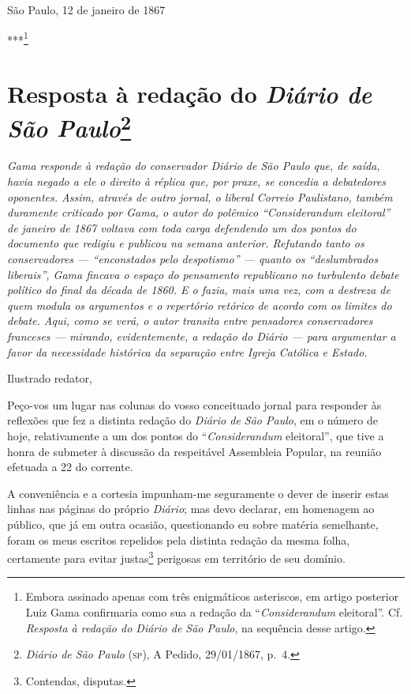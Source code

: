 \begin{flushright}
São Paulo, 12 de janeiro de 1867

***\footnote{Embora assinado apenas com três enigmáticos asteriscos,
  em artigo posterior Luiz Gama confirmaria como sua a redação da
  ``\textit{Considerandum} eleitoral''. Cf. \emph{Resposta à redação do Diário de
  São Paulo}, na sequência desse artigo.}
\end{flushright}

\chapter{Resposta à redação do \emph{Diário de São Paulo}\footnote{
  \emph{Diário de São Paulo} (\textsc{sp}), A Pedido, 29/01/1867, p.~4.}}

\begin{didascalia}\itshape
Gama responde à redação do conservador \textnormal{Diário de São Paulo} que, de
saída, havia negado a ele o direito à réplica que, por praxe, se
concedia a debatedores oponentes. Assim, através de outro jornal, o
liberal \textnormal{Correio Paulistano}, também duramente criticado por Gama,
o autor do polêmico ``\textnormal{Considerandum} eleitoral'' de janeiro de 1867
voltava com toda carga defendendo um dos pontos do documento que redigiu
e publicou na semana anterior. Refutando tanto os conservadores ---
``enconstados pelo despotismo'' --- quanto os ``deslumbrados liberais'', Gama
fincava o espaço do pensamento republicano no turbulento debate político
do final da década de 1860. E o fazia, mais uma vez, com a destreza de
quem modula os argumentos e o repertório retórico de acordo com os
limites do debate. Aqui, como se verá, o autor transita entre pensadores
conservadores franceses --- mirando, evidentemente, a redação do \textnormal{Diário}
--- para argumentar a favor da necessidade histórica da separação
entre Igreja Católica e Estado.
\end{didascalia}



Ilustrado redator,

Peço-vos um lugar nas colunas do vosso conceituado jornal para responder
às reflexões que fez a distinta redação do \emph{Diário de São Paulo}, em
o número de hoje, relativamente a um dos pontos do ``\textit{Considerandum}
eleitoral'', que tive a honra de submeter à discussão da respeitável
Assembleia Popular, na reunião efetuada a 22 do corrente.

A conveniência e a cortesia impunham-me seguramente o dever de inserir
estas linhas nas páginas do próprio \emph{Diário}; mas devo declarar, em
homenagem ao público, que já em outra ocasião, questionando eu sobre
matéria semelhante, foram os meus escritos repelidos pela distinta
redação da mesma folha, certamente para evitar justas\footnote{
  Contendas, disputas.} perigosas em território de seu domínio.

